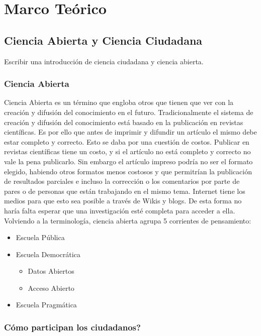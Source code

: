 \chapter{Marco Teórico}
\section{Ciencia  Abierta y Ciencia Ciudadana}

Escribir una introducción de ciencia ciudadana y ciencia abierta.

\subsection{Ciencia Abierta}
Ciencia Abierta es un término que engloba otros que tienen que ver con la creación y difusión del conocimiento en el futuro. Tradicionalmente el sistema de creación y difusión del conocimiento está basado en la publicación en revistas científicas. Es por ello que antes de imprimir y difundir un artículo el mismo debe estar completo y correcto. Esto se daba por una cuestión de costos. Publicar en revistas científicas tiene un costo, y si el artículo no está completo y correcto no vale la pena publicarlo. Sin embargo el artículo impreso podría no ser el formato elegido, habiendo otros formatos menos costosos y que permitrían la publicación de resultados parciales e incluso la corrección o los comentarios por parte de pares o de personas que están trabajando en el mismo tema. Internet tiene los medios para que esto sea posible a través de Wikis y blogs. De esta forma no haría falta esperar que una investigación esté completa para acceder a ella. \cite{bartling2014opening}
Volviendo a la terminología, ciencia abierta agrupa 5 corrientes de pensamiento:
\begin{itemize}
	\item {Escuela Pública}
	\item {Escuela Democrática}
	\begin{itemize}
		\item{Datos Abiertos}	
		\item{Acceso Abierto}
	\end{itemize}
	\item {Escuela Pragmática}
\end{itemize}	
	
\subsection{Cómo participan los ciudadanos?}

